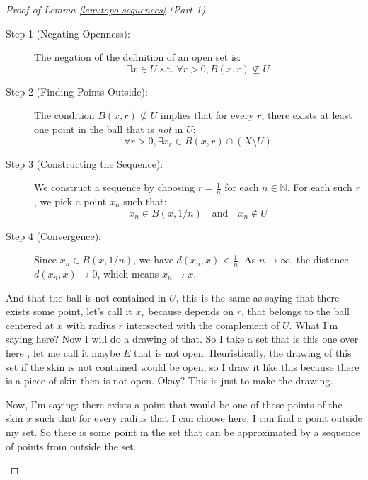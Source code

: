 \begin{proof}[Proof of Lemma \ref{lem:topo-sequences} (Part 1)]
\begin{math-stroke}[Implication \texorpdfstring{$\impliedby$}{<=} via Contraposition]
\begin{description}
    \item[Step 1 (Negating Openness):] The negation of the definition of an open set is:
    \[ \exists x \in U \text{ s.t. } \forall r > 0, B(x, r) \not\subseteq U \]
    \item[Step 2 (Finding Points Outside):] The condition $B(x, r) \not\subseteq U$ implies that for every $r$, there exists at least one point in the ball that is \emph{not} in $U$:
    \[ \forall r > 0, \exists x_r \in B(x, r) \cap (X \setminus U) \]
    \item[Step 3 (Constructing the Sequence):] We construct a sequence by choosing $r = \frac{1}{n}$ for each $n \in \mathbb{N}$. For each such $r$, we pick a point $x_n$ such that:
    \[ x_n \in B(x, 1/n) \quad \text{and} \quad x_n \notin U \]
    \item[Step 4 (Convergence):] Since $x_n \in B(x, 1/n)$, we have $d(x_n, x) < \frac{1}{n}$. As $n \to \infty$, the distance $d(x_n, x) \to 0$, which means $x_n \to x$.
\end{description}
\end{math-stroke}

\begin{spoken-clean}[00:21:15 - 00:23:12]
And that the ball is not contained in $U$, this is the same as saying that there exists some point, let's call it $x_r$ because depends on $r$, that belongs to the ball centered at $x$ with radius $r$ intersected with the complement of $U$. What I'm saying here? Now I will do a drawing of that. So I take a set that is this one over here , let me call it maybe $E$ that is not open. Heuristically, the drawing of this set if the skin is not contained would be open, so I draw it like this because there is a piece of skin then is not open. Okay? This is just to make the drawing.

Now, I'm saying: there exists a point that would be one of these points of the skin $x$ such that for every radius that I can choose here, I can find a point outside my set. So there is some point in the set that can be approximated by a sequence of points from outside the set.
\end{spoken-clean}


\end{proof}
